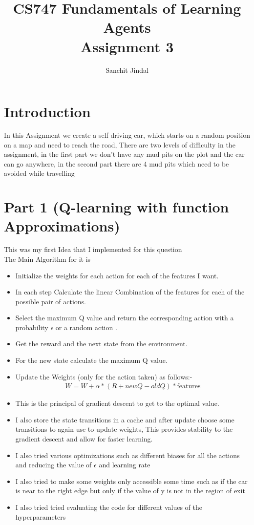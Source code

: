 \documentclass[10pt]{article}
\title{CS747 Fundamentals of Learning Agents \\ Assignment 3}
\author{Sanchit Jindal \quad 200020120}
\date{}
\begin{document}
\maketitle

\section{Introduction}
In this Assignment we create a self driving car, which starts on a random position on a map and need to reach the road,
There are two levels of difficulty in the assignment, in the first part we don't have any mud pits on the plot and the car can go anywhere, in the second part there are 4 mud pits which need to be avoided while travelling

\section{Part 1 (Q-learning with function Approximations)}
This was my first Idea that I implemented for this question 
\\The Main Algorithm for it is
\begin{itemize}
    \item Initialize the weights for each action for each of the features I want.
    \item In each step Calculate the linear Combination of the features for each of the possible pair of actions.
    \item Select the maximum Q value and return the corresponding action with a probability $\epsilon$ or a random action .
    \item Get the reward and the next state from the environment.
    \item For the new state calculate the maximum Q value.
    \item Update the Weights (only for the action taken) as follows:-
    \begin{align*}
        W = W + \alpha * (R + newQ - oldQ) * \text{features}
    \end{align*} 
    \item This is the principal of gradient descent to get to the optimal value.
    \item I also store the state transitions in a cache and after update choose some transitions to again use to update weights, This provides stability to the gradient descent and allow for faster learning.
    \item I also tried various optimizations such as different biases for all the actions and reducing the value of $\epsilon$ and learning rate
    \item I also tried to make some weights only accessible some time such as if the car is near to the right edge but only if the value of y is not in the region of exit
    \item I also tried tried evaluating the code for different values of the hyperparameters
\end{itemize}
\end{document}
